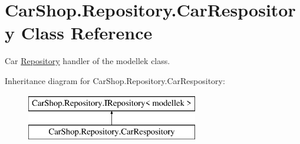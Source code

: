\hypertarget{class_car_shop_1_1_repository_1_1_car_respository}{}\section{Car\+Shop.\+Repository.\+Car\+Respository Class Reference}
\label{class_car_shop_1_1_repository_1_1_car_respository}


Car \mbox{\hyperlink{namespace_car_shop_1_1_repository}{Repository}} handler of the modellek class.  


Inheritance diagram for Car\+Shop.\+Repository.\+Car\+Respository\+:\begin{figure}[H]
\begin{center}
\leavevmode
\includegraphics[height=2.000000cm]{class_car_shop_1_1_repository_1_1_car_respository}
\end{center}
\end{figure}

